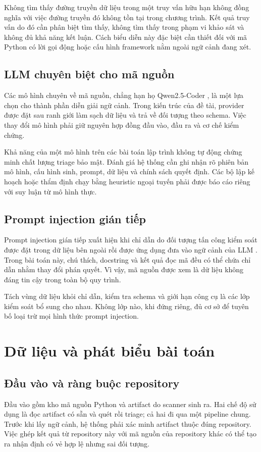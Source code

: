 \documentclass[11pt,a4paper]{article}
\begin{document}
Không tìm thấy đường truyền dữ liệu trong một truy vấn hữu hạn không đồng nghĩa với việc đường truyền đó không tồn tại trong chương trình. Kết quả truy vấn do đó cần phân biệt tìm thấy, không tìm thấy trong phạm vi khảo sát và không đủ khả năng kết luận. Cách biểu diễn này đặc biệt cần thiết đối với mã Python có lời gọi động hoặc cấu hình framework nằm ngoài ngữ cảnh đang xét.

\subsection{LLM chuyên biệt cho mã nguồn}
Các mô hình chuyên về mã nguồn, chẳng hạn họ Qwen2.5-Coder \citep{hui2024}, là một lựa chọn cho thành phần diễn giải ngữ cảnh. Trong kiến trúc của đề tài, provider được đặt sau ranh giới làm sạch dữ liệu và trả về đối tượng theo schema. Việc thay đổi mô hình phải giữ nguyên hợp đồng đầu vào, đầu ra và cơ chế kiểm chứng.

Khả năng của một mô hình trên các bài toán lập trình không tự động chứng minh chất lượng triage bảo mật. Đánh giá hệ thống cần ghi nhận rõ phiên bản mô hình, cấu hình sinh, prompt, dữ liệu và chính sách quyết định. Các bộ lập kế hoạch hoặc thẩm định chạy bằng heuristic ngoại tuyến phải được báo cáo riêng với suy luận từ mô hình thực.

\subsection{Prompt injection gián tiếp}
Prompt injection gián tiếp xuất hiện khi chỉ dẫn do đối tượng tấn công kiểm soát được đặt trong dữ liệu bên ngoài rồi được ứng dụng đưa vào ngữ cảnh của LLM \citep{greshake2023}. Trong bài toán này, chú thích, docstring và kết quả đọc mã đều có thể chứa chỉ dẫn nhằm thay đổi phán quyết. Vì vậy, mã nguồn được xem là dữ liệu không đáng tin cậy trong toàn bộ quy trình.

Tách vùng dữ liệu khỏi chỉ dẫn, kiểm tra schema và giới hạn công cụ là các lớp kiểm soát bổ sung cho nhau. Không lớp nào, khi đứng riêng, đủ cơ sở để tuyên bố loại trừ mọi hình thức prompt injection.

\section{Dữ liệu và phát biểu bài toán}
\subsection{Đầu vào và ràng buộc repository}
Đầu vào gồm kho mã nguồn Python và artifact do scanner sinh ra. Hai chế độ sử dụng là đọc artifact có sẵn và quét rồi triage; cả hai đi qua một pipeline chung. Trước khi lấy ngữ cảnh, hệ thống phải xác minh artifact thuộc đúng repository. Việc ghép kết quả từ repository này với mã nguồn của repository khác có thể tạo ra nhận định có vẻ hợp lệ nhưng sai đối tượng.
\end{document}
